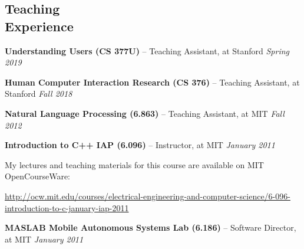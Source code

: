 \documentclass[margin,line]{resume}
\begin{document}
\begin{resume}
\section{\mysidestyle Teaching\\Experience}

\textbf{Understanding Users (CS 377U)} -- Teaching Assistant, at Stanford \hfill \textsl{Spring 2019} \\

\vspace{-8mm}

\textbf{Human Computer Interaction Research (CS 376)} -- Teaching Assistant, at Stanford \hfill \textsl{Fall 2018} \\

\vspace{-8mm}

\textbf{Natural Language Processing (6.863)} -- Teaching Assistant, at MIT \hfill \textsl{Fall 2012} \\

\vspace{-8mm}

\textbf{Introduction to C++ IAP (6.096)} -- Instructor, at MIT \hfill \textsl{January 2011}\\

\vspace{-8mm}

My lectures and teaching materials for this course are available on MIT OpenCourseWare:\\

\vspace{-8mm}

\url{http://ocw.mit.edu/courses/electrical-engineering-and-computer-science/6-096-introduction-to-c-january-iap-2011} \\

\vspace{-7mm}

\textbf{MASLAB Mobile Autonomous Systems Lab (6.186)} -- Software Director, at MIT \hfill \textsl{January 2011}\\


\end{resume}
\end{document}
